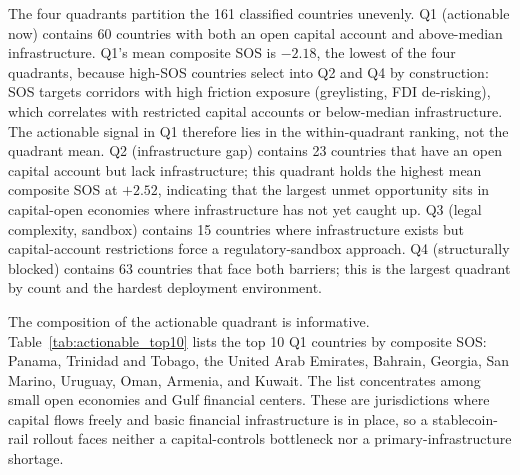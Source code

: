 \begin{table}[htbp]
\centering
\caption{Feasibility Quadrant Summary}
\label{tab:quadrant}
\begin{threeparttable}
\small

\begin{tablenotes}
\end{tablenotes}
\end{threeparttable}
\end{table}

The four quadrants partition the 161 classified countries unevenly. Q1 (actionable now) contains 60 countries with both an open capital account and above-median infrastructure. Q1's mean composite SOS is $-2.18$, the lowest of the four quadrants, because high-SOS countries select into Q2 and Q4 by construction: SOS targets corridors with high friction exposure (greylisting, FDI de-risking), which correlates with restricted capital accounts or below-median infrastructure. The actionable signal in Q1 therefore lies in the within-quadrant ranking, not the quadrant mean. Q2 (infrastructure gap) contains 23 countries that have an open capital account but lack infrastructure; this quadrant holds the highest mean composite SOS at $+2.52$, indicating that the largest unmet opportunity sits in capital-open economies where infrastructure has not yet caught up. Q3 (legal complexity, sandbox) contains 15 countries where infrastructure exists but capital-account restrictions force a regulatory-sandbox approach. Q4 (structurally blocked) contains 63 countries that face both barriers; this is the largest quadrant by count and the hardest deployment environment.

The composition of the actionable quadrant is informative. Table~\ref{tab:actionable_top10} lists the top 10 Q1 countries by composite SOS: Panama, Trinidad and Tobago, the United Arab Emirates, Bahrain, Georgia, San Marino, Uruguay, Oman, Armenia, and Kuwait. The list concentrates among small open economies and Gulf financial centers. These are jurisdictions where capital flows freely and basic financial infrastructure is in place, so a stablecoin-rail rollout faces neither a capital-controls bottleneck nor a primary-infrastructure shortage.


